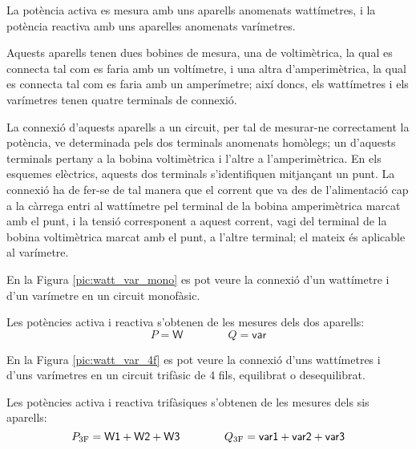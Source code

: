 La potència activa es mesura amb uns aparells anomenats wattímetres,
i la potència reactiva amb uns aparelles anomenats varímetres.

Aquests aparells tenen dues bobines de mesura, una de voltimètrica,
la qual es connecta tal com es faria amb un voltímetre, i una altra
d'amperimètrica, la qual es connecta tal com es faria amb un
amperímetre; així doncs, els wattímetres i els varímetres tenen
quatre terminals de connexió.

La connexió d'aquests aparells a un circuit, per tal de
mesurar-ne correctament la potència, ve determinada pels dos terminals
anomenats homòlegs; un d'aquests terminals pertany a la bobina
voltimètrica i l'altre a l'amperimètrica. En els esquemes elèctrics,
aquests dos terminals s'identifiquen mitjançant un punt. La connexió
ha de fer-se de tal manera que el corrent que va des de
l'alimentació cap a la càrrega entri al wattímetre pel terminal de
la bobina amperimètrica marcat amb el punt, i la tensió corresponent
a aquest corrent, vagi del terminal de la bobina voltimètrica marcat
amb el punt, a l'altre terminal; el mateix és aplicable al
varímetre.

En la Figura \vref{pic:watt_var_mono} es pot veure la connexió d'un
wattímetre i d'un varímetre en un circuit monofàsic.


\begin{center}
    
    \label{pic:watt_var_mono}
\end{center}

Les potències activa i reactiva s'obtenen de les mesures dels dos
aparells:
\begin{equation}
    P = \textsf{W} \qquad\qquad Q = \textsf{var}
\end{equation}

En la Figura \vref{pic:watt_var_4f} es pot veure la connexió d'uns
wattímetres i d'uns varímetres en un circuit trifàsic de 4 fils,
equilibrat o desequilibrat.

\begin{center}
    
    \label{pic:watt_var_4f}
\end{center}

Les potències activa i reactiva trifàsiques s'obtenen de les mesures
dels sis aparells:
\begin{equation}
    P_\mathrm{3F} = \textsf{W1} +  \textsf{W2} + \textsf{W3}
    \qquad\qquad Q_\mathrm{3F} = \textsf{var1} +  \textsf{var2} + \textsf{var3}
\end{equation}


